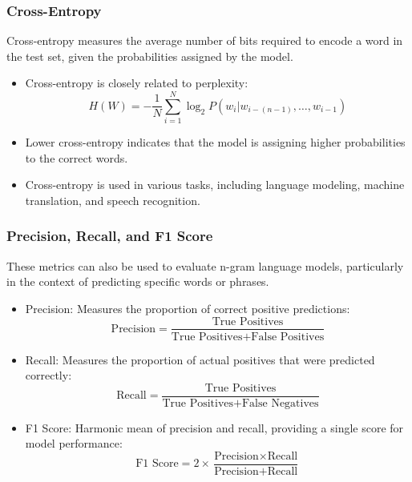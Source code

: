 \documentclass{beamer}
\begin{document}
\begin{frame}
\frametitle{Cross-Entropy}
Cross-entropy measures the average number of bits required to encode a word in the test set, given the probabilities assigned by the model.
\begin{itemize}
    \item Cross-entropy is closely related to perplexity:
    \[
    H(W) = -\frac{1}{N} \sum_{i=1}^{N} \log_2 P(w_i | w_{i-(n-1)}, \dots, w_{i-1})
    \]
    \item Lower cross-entropy indicates that the model is assigning higher probabilities to the correct words.
    \item Cross-entropy is used in various tasks, including language modeling, machine translation, and speech recognition.
\end{itemize}
\end{frame}

\begin{frame}
\frametitle{Precision, Recall, and F1 Score}
These metrics can also be used to evaluate n-gram language models, particularly in the context of predicting specific words or phrases.
\begin{itemize}
    \item Precision: Measures the proportion of correct positive predictions:
    \[
    \text{Precision} = \frac{\text{True Positives}}{\text{True Positives} + \text{False Positives}}
    \]
    \item Recall: Measures the proportion of actual positives that were predicted correctly:
    \[
    \text{Recall} = \frac{\text{True Positives}}{\text{True Positives} + \text{False Negatives}}
    \]
    \item F1 Score: Harmonic mean of precision and recall, providing a single score for model performance:
    \[
    \text{F1 Score} = 2 \times \frac{\text{Precision} \times \text{Recall}}{\text{Precision} + \text{Recall}}
    \]
\end{itemize}
\end{frame}

\end{document}
